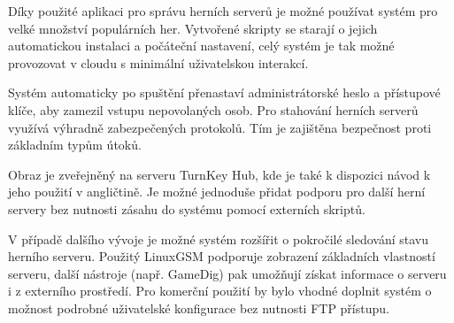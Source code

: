 \documentclass{article}
\begin{document}
Díky použité aplikaci pro správu herních serverů je možné používat systém pro velké množství populárních her.
Vytvořené skripty se starají o jejich automatickou instalaci a počáteční nastavení, celý systém je tak
možné provozovat v cloudu s minimální uživatelskou interakcí.

Systém automaticky po spuštění přenastaví administrátorské heslo a přístupové klíče, aby zamezil vstupu
nepovolaných osob. Pro stahování herních serverů využívá výhradně zabezpečených protokolů.
Tím je zajištěna bezpečnost proti základním typům útoků.

Obraz je zveřejněný na serveru TurnKey Hub, kde je také k dispozici návod k jeho použití v angličtině.
Je možné jednoduše přidat podporu pro další herní servery bez nutnosti zásahu do systému pomocí externích skriptů.

V případě dalšího vývoje je možné systém rozšířit o pokročilé sledování stavu herního serveru. Použitý LinuxGSM podporuje
zobrazení základních vlastností serveru, další nástroje (např. GameDig) pak umožňují získat informace o serveru i z externího
prostředí. Pro komerční použití by bylo vhodné doplnit systém o možnost podrobné uživatelské konfigurace bez nutnosti FTP přístupu.


\printbibliography
\end{document}
